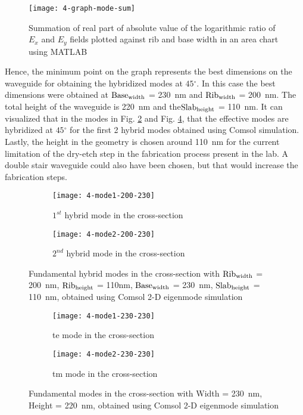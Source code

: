 \documentclass[../report.tex]{subfiles}
\begin{document}
\begin{figure}[H] %
	\centering
	\texttt{[image: 4-graph-mode-sum]}
	\caption{Summation of real part of absolute value of the logarithmic ratio of $E_x$ and $E_y$ fields plotted against rib and base width in an area chart using MATLAB}
	\label{fig:4_graph_mode_sum}
\end{figure}  
\noindent Hence, the minimum point on the graph represents the best dimensions on the waveguide for obtaining the hybridized modes at $45{^\circ}$. In this case the best dimensions were obtained at $\mathrm{Base_{width}}$ = \SI{230}{\nano \meter} and $\mathrm{Rib_{width}}$ = \SI{200}{\nano \meter}. The total height of the waveguide is \SI{220}{\nano \meter} and the$\mathrm{Slab_{height}}$ = \SI{110}{\nano \meter}. It can visualized that in the modes in Fig. \ref{fig:4_mode1_200_230} and Fig. \ref{fig:4_mode2_200_230}, that the effective modes are hybridized at $45{^\circ}$ for the first 2 hybrid modes obtained using Comsol simulation. Lastly, the height in the geometry is chosen around \SI{110}{\nano \meter} for the current limitation of the dry-etch step in the fabrication process present in the lab. A double stair waveguide could also have been chosen, but that would increase the fabrication steps.
\begin{figure}[H] %
	\begin{subfigure}[t]{0.45\textwidth}
		\texttt{[image: 4-mode1-200-230]}
		\caption{$1^{st}$ hybrid mode in the cross-section}
		\label{fig:4_mode1_200_230}
	\end{subfigure}
	\hfill
	\begin{subfigure}[t]{0.45\textwidth}
		\texttt{[image: 4-mode2-200-230]}
		\caption{$2^{nd}$ hybrid mode in the cross-section}
		\label{fig:4_mode2_200_230}
	\end{subfigure}
	\caption{Fundamental hybrid modes in the cross-section with $\mathrm{Rib_{width}}$ = \SI{200}{\nano \meter}, $\mathrm{Rib_{height}}$ = 110nm, $\mathrm{Base_{width}}$ = \SI{230}{\nano \meter}, $\mathrm{Slab_{height}}$ = \SI{110}{\nano \meter}, obtained using Comsol 2-D eigenmode simulation}
\end{figure}

\begin{figure}[H] %
	\begin{subfigure}[t]{0.45\textwidth}
		\texttt{[image: 4-mode1-230-230]}
		\caption{\gls{te} mode in the cross-section}
		\label{fig:4_mode1_230_230}
	\end{subfigure}
	\hfill
	\begin{subfigure}[t]{0.45\textwidth}
		\texttt{[image: 4-mode2-230-230]}
		\caption{\gls{tm} mode in the cross-section}
		\label{fig:4_mode2_230_230}
	\end{subfigure}
	\caption{Fundamental modes in the cross-section with Width = \SI{230}{\nano \meter}, Height = \SI{220}{\nano \meter}, obtained using Comsol 2-D eigenmode simulation}
\end{figure}
\end{document}
